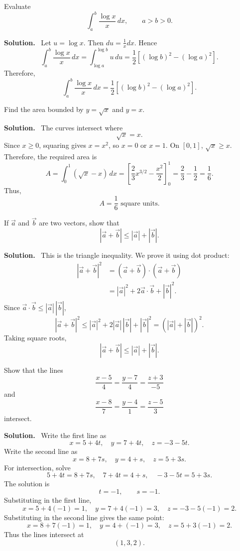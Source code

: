 \documentclass[11pt,a4paper]{article}
\newcommand{\question}[2]{\begin{tcolorbox}[breakable,colback=gray!5,colframe=black!35,title=\textbf{Question #1}]#2\end{tcolorbox}}
\newcommand{\answer}{\textbf{Solution.}\ }
\begin{document}
\question{4(b)}{Evaluate
\[
\int_a^b \frac{\log x}{x}\,dx,\qquad a>b>0.
\]}
\answer
Let $u=\log x$. Then $du=\frac{1}{x}dx$. Hence
\[
\int_a^b \frac{\log x}{x}\,dx=\int_{\log a}^{\log b}u\,du
=\frac12\left[(\log b)^2-(\log a)^2\right].
\]
Therefore,
\[
\boxed{\int_a^b \frac{\log x}{x}\,dx=\frac12\left[(\log b)^2-(\log a)^2\right].}
\]

\question{4(c)}{Find the area bounded by $y=\sqrt{x}$ and $y=x$.}
\answer
The curves intersect where
\[
\sqrt{x}=x.
\]
Since $x\ge0$, squaring gives $x=x^2$, so $x=0$ or $x=1$. On $[0,1]$, $\sqrt{x}\ge x$. Therefore, the required area is
\[
A=\int_0^1(\sqrt{x}-x)\,dx
=\left[\frac{2}{3}x^{3/2}-\frac{x^2}{2}\right]_0^1
=\frac23-\frac12=\frac16.
\]
Thus,
\[
\boxed{A=\frac16\text{ square units}.}
\]

\begin{center}
\end{center}

\question{4(d)}{If $\vec a$ and $\vec b$ are two vectors, show that
\[
|\vec a+\vec b|\le |\vec a|+|\vec b|.
\]}
\answer
This is the triangle inequality. We prove it using dot product:
\begin{align*}
|\vec a+\vec b|^2
&=(\vec a+\vec b)\cdot(\vec a+\vec b)\\
&=|\vec a|^2+2\vec a\cdot\vec b+|\vec b|^2.
\end{align*}
Since $\vec a\cdot\vec b\le |\vec a|\,|\vec b|$,
\[
|\vec a+\vec b|^2\le |\vec a|^2+2|\vec a|\,|\vec b|+|\vec b|^2
=(|\vec a|+|\vec b|)^2.
\]
Taking square roots,
\[
\boxed{|\vec a+\vec b|\le |\vec a|+|\vec b|.}
\]

\question{5(a)}{Show that the lines
\[
\frac{x-5}{4}=\frac{y-7}{4}=\frac{z+3}{-5}
\]
and
\[
\frac{x-8}{7}=\frac{y-4}{1}=\frac{z-5}{3}
\]
intersect.}
\answer
Write the first line as
\[
x=5+4t,
\quad y=7+4t,
\quad z=-3-5t.
\]
Write the second line as
\[
x=8+7s,
\quad y=4+s,
\quad z=5+3s.
\]
For intersection, solve
\[
5+4t=8+7s,
\quad 7+4t=4+s,
\quad -3-5t=5+3s.
\]
The solution is
\[
t=-1,
\qquad s=-1.
\]
Substituting in the first line,
\[
x=5+4(-1)=1,
\quad y=7+4(-1)=3,
\quad z=-3-5(-1)=2.
\]
Substituting in the second line gives the same point:
\[
x=8+7(-1)=1,
\quad y=4+(-1)=3,
\quad z=5+3(-1)=2.
\]
Thus the lines intersect at
\[
\boxed{(1,3,2).}
\]
\end{document}
